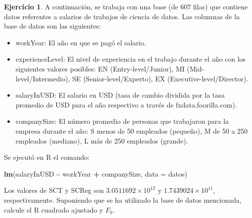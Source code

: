 \documentclass[
  11pt,
]{book}
\newenvironment{Shaded}{\begin{snugshade}}{\end{snugshade}}
\newcommand{\AttributeTok}[1]{\textcolor[rgb]{0.13,0.29,0.53}{#1}}
\newcommand{\FunctionTok}[1]{\textcolor[rgb]{0.13,0.29,0.53}{\textbf{#1}}}
\newcommand{\NormalTok}[1]{#1}
\newcommand{\SpecialCharTok}[1]{\textcolor[rgb]{0.81,0.36,0.00}{\textbf{#1}}}
\providecommand{\tightlist}{%
  \setlength{\itemsep}{0pt}\setlength{\parskip}{0pt}}
\theoremstyle{definition}
\theoremstyle{definition}
\theoremstyle{definition}
\newtheorem{exercise}{Ejercicio}[chapter]
\theoremstyle{definition}
\theoremstyle{remark}
\begin{document}
\begin{exercise}
A continuación, se trabaja con una base (de 607 filas) que contiene datos referentes a salarios de trabajos de ciencia de datos. Las columnas de la base de datos son las siguientes:

\begin{itemize}
\tightlist
\item
  workYear: El año en que se pagó el salario.
\item
  experienceLevel: El nivel de experiencia en el trabajo durante el año con los siguientes valores posibles: EN (Entry-level/Junior), MI (Mid-level/Intermedio), SE (Senior-level/Experto), EX (Executive-level/Director).
\item
  salaryInUSD: El salario en USD (tasa de cambio dividida por la tasa promedio de USD para el año respectivo a través de fxdata.foorilla.com).
\item
  companySize: El número promedio de personas que trabajaron para la empresa durante el año: S menos de 50 empleados (pequeño), M de 50 a 250 empleados (mediano), L más de 250 empleados (grande).
\end{itemize}

Se ejecutó en R el comando:

\begin{Shaded}
\begin{Highlighting}[]
\FunctionTok{lm}\NormalTok{(salaryInUSD }\SpecialCharTok{\textasciitilde{}}\NormalTok{ workYear }\SpecialCharTok{+}\NormalTok{ companySize, }\AttributeTok{data =}\NormalTok{ datos)}
\end{Highlighting}
\end{Shaded}

Los valores de SCT y SCReg son \(\ensuremath{3.0511692\times 10^{12}}\) y \(\ensuremath{1.7439024\times 10^{11}}\), respectivamente. Suponiendo que se ha utilizado la base de datos mencionada, calcule el R cuadrado ajustado y \(F_0\).
\end{exercise}
\end{document}
